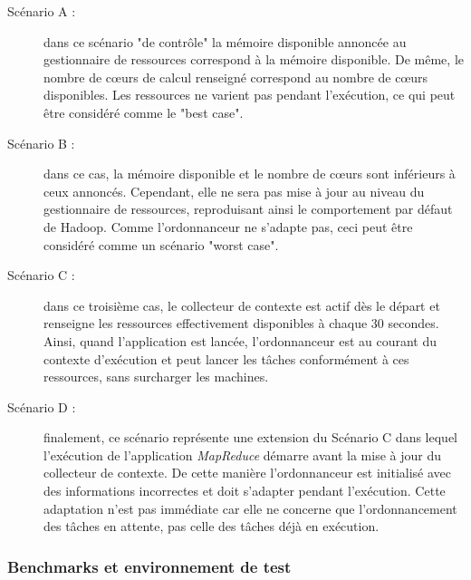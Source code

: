 \begin{description}
	\item[Scénario A :] dans ce scénario "de contrôle" la mémoire disponible annoncée au gestionnaire de ressources correspond à la mémoire disponible. De même, le nombre de c{\oe}urs de calcul renseigné correspond au nombre de c{\oe}urs disponibles. Les ressources ne varient pas pendant l'exécution, ce qui peut être considéré comme le "best case". 
	\item[Scénario B :] dans ce cas, la mémoire disponible et le nombre de c{\oe}urs sont inférieurs à ceux annoncés. Cependant, elle ne sera pas mise à jour au niveau du gestionnaire de ressources, reproduisant ainsi le comportement par défaut de Hadoop. Comme l'ordonnanceur ne s'adapte pas, ceci peut être considéré comme un scénario "worst case".
	\item[Scénario C :] dans ce troisième cas, le collecteur de contexte est actif dès le départ et renseigne les ressources effectivement disponibles à chaque 30 secondes. Ainsi, quand l'application est lancée, l'ordonnanceur est au courant du contexte d'exécution et peut lancer les tâches conformément à ces ressources, sans surcharger les machines. 
	\item[Scénario D :] finalement, ce scénario représente une extension du Scénario C dans lequel l'exécution de l'application \textit{MapReduce} démarre avant la mise à jour du collecteur de contexte. De cette manière l'ordonnanceur est initialisé avec des informations incorrectes et doit s'adapter pendant l'exécution. Cette adaptation n'est pas immédiate car elle ne concerne que l'ordonnancement des tâches en attente, pas celle des tâches déjà en exécution.
\end{description}


\subsubsection{Benchmarks et environnement de test}

